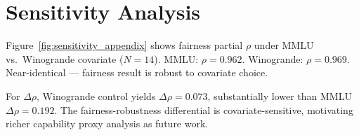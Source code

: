 \section{Sensitivity Analysis}
\label{sec:appendix}

Figure~\ref{fig:sensitivity_appendix} shows fairness partial $\rho$ under MMLU vs.\ Winogrande covariate ($N=14$). MMLU: $\rho = 0.962$. Winogrande: $\rho = 0.969$. Near-identical --- fairness result is robust to covariate choice.

For $\Delta\rho$, Winogrande control yields $\Delta\rho = 0.073$, substantially lower than MMLU $\Delta\rho = 0.192$. The fairness-robustness differential is covariate-sensitive, motivating richer capability proxy analysis as future work.
